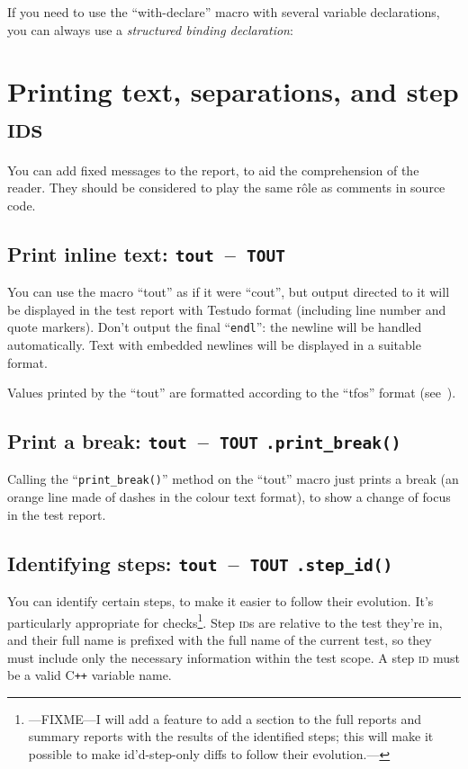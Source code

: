 \documentclass[twoside, a4paper, article]{memoir}
\newcommand*\testudocolor{\color{red!80!blue}}
\newcommand*\testudo[1]{\texttt{\testudocolor{}#1}}
\newcommand*\testudopair[2]{\testudo{#1}~--~\testudo{#2}}
\newcommand\subsectiontestudopair[3]{%
  \subsection[#1]{#1: \testudopair{#2}{#3}}}
\newcommand\typesetexampleandreport[1]{%
  \typesetexamplesource{#1}
  \typesetexamplereport{#1}
}
\providecommand\typesetexamplereport[1]{%
}
\providecommand\typesetexamplesource[1]{%
}
\newcommand*\Cpp{C\texttt{++}}
\begin{document}
\typesetexampleandreport{with-declare}

If you need to use the ``with-declare'' macro with several variable
declarations, you can always use a \emph{structured binding declaration}:

\typesetexampleandreport{with-declare-several}


\section{Printing text, separations, and step \textsc{id}s}
\label{sec:printing-text-separations-step-ids}

You can add fixed messages to the report, to aid the comprehension of the
reader.  They should be considered to play the same rôle as comments in source
code.

\subsectiontestudopair{Print inline text}{tout}{TOUT}
\label{sec:tout}

You can use the macro ``tout'' as if it were ``cout'', but output directed to
it will be displayed in the test report with Testudo format (including line
number and quote markers).  Don't output the final ``\texttt{endl}'': the
newline will be handled automatically.  Text with embedded newlines will be
displayed in a suitable format.

\typesetexampleandreport{tout}

Values printed by the ``tout'' are formatted according to the ``tfos'' format
(see~).

\subsection[Print a break]%
  {Print a break: \testudopair{tout}{TOUT} \texttt{.print\_break()}}
\label{sec:print-break}

Calling the ``\texttt{print\_break()}'' method on the ``tout'' macro just
prints a break (an orange line made of dashes in the colour text format), to
show a change of focus in the test report.

\typesetexampleandreport{print-break}

\subsection[Identifying steps]%
  {Identifying steps: \testudopair{tout}{TOUT} \texttt{.step\_id()}}
\label{sec:identifying-steps}

You can identify certain steps, to make it easier to follow their evolution.
It's particularly appropriate for checks\footnote{---FIXME---I will add a
  feature to add a section to the full reports and summary reports with the
  results of the identified steps; this will make it possible to make
  id'd-step-only diffs to follow their evolution.---}.  Step \textsc{id}s are
relative to the test they're in, and their full name is prefixed with the full
name of the current test, so they must include only the necessary information
within the test scope.  A step \textsc{id} must be a valid \Cpp{} variable
name.
\end{document}
